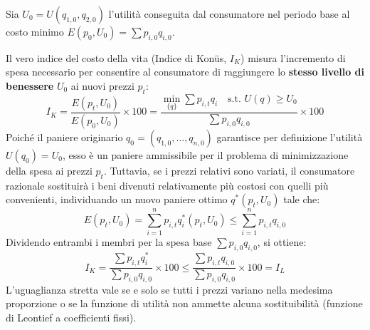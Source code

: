 \begin{dimostrazione}
Sia $U_0 = U(q_{1,0}, q_{2,0})$ l'utilità conseguita dal consumatore nel periodo base al costo minimo $E(p_0, U_0) = \sum p_{i,0} q_{i,0}$.

Il vero indice del costo della vita (Indice di Konüs, $I_K$) misura l'incremento di spesa necessario per consentire al consumatore di raggiungere lo \textbf{stesso livello di benessere} $U_0$ ai nuovi prezzi $p_t$:
\begin{equation}
    I_K = \frac{E(p_t, U_0)}{E(p_0, U_0)} \times 100 = \frac{\min_{\{q\}} \sum p_{i,t} q_i \quad \text{s.t. } U(q) \ge U_0}{\sum p_{i,0} q_{i,0}} \times 100
\end{equation}
Poiché il paniere originario $q_0 = (q_{1,0}, \dots, q_{n,0})$ garantisce per definizione l'utilità $U(q_0) = U_0$, esso è un paniere ammissibile per il problema di minimizzazione della spesa ai prezzi $p_t$. Tuttavia, se i prezzi relativi sono variati, il consumatore razionale sostituirà i beni divenuti relativamente più costosi con quelli più convenienti, individuando un nuovo paniere ottimo $q^*(p_t, U_0)$ tale che:
\begin{equation}
    E(p_t, U_0) = \sum_{i=1}^n p_{i,t} q_i^*(p_t, U_0) \le \sum_{i=1}^n p_{i,t} q_{i,0}
\end{equation}
Dividendo entrambi i membri per la spesa base $\sum p_{i,0} q_{i,0}$, si ottiene:
\begin{equation}
    I_K = \frac{\sum p_{i,t} q_i^*}{\sum p_{i,0} q_{i,0}} \times 100 \le \frac{\sum p_{i,t} q_{i,0}}{\sum p_{i,0} q_{i,0}} \times 100 = I_L
\end{equation}
L'uguaglianza stretta vale se e solo se tutti i prezzi variano nella medesima proporzione o se la funzione di utilità non ammette alcuna sostituibilità (funzione di Leontief a coefficienti fissi).
\end{dimostrazione}


